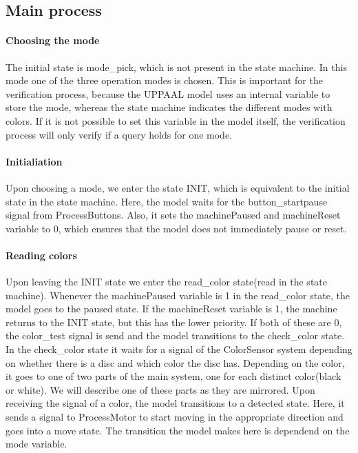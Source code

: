 \documentclass[a4paper,oneside,11pt]{article}
\begin{document}
\subsection{Main process}
\paragraph{Choosing the mode}
The initial state is mode\_pick, which is not present in the state machine. In this mode one of the three operation modes is chosen. This is important for the verification process, because the UPPAAL model uses an internal variable to store the mode, whereas the state machine indicates the different modes with colors. If it is not possible to set this variable in the model itself, the verification process will only verify if a query holds for one mode.

\paragraph{Initialiation}
Upon choosing a mode, we enter the state INIT, which is equivalent to the initial state in the state machine. Here, the model waits for the button\_startpause signal from ProcessButtons. Also, it sets the machinePaused and machineReset variable to 0, which ensures that the model does not immediately pause or reset.

\paragraph{Reading colors}
Upon leaving the INIT state we enter the read\_color state(read in the state machine). Whenever the machinePaused variable is 1 in the read\_color state, the model goes to the paused state. If the machineReset variable is 1, the machine returns to the INIT state, but this has the lower priority. If both of these are 0, the color\_test signal is send and the model transitions to the check\_color state.  In the check\_color state it waits for a signal of the ColorSensor system depending on whether there is a disc and which color the disc has. Depending on the color, it goes to one of two parts of the main system, one for each distinct color(black or white). We will describe one of these parts as they are mirrored. Upon receiving the signal of a color, the model transitions to a detected state. Here, it sends a signal to ProcessMotor to start moving in the appropriate direction and goes into a move state. The transition the model makes here is dependend on the mode variable.
\end{document}
